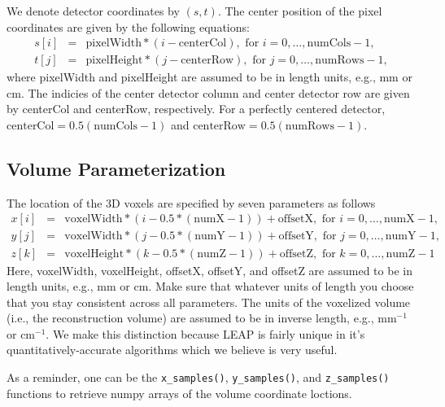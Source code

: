 \documentclass[11pt]{article}
\begin{document}
We denote detector coordinates by $(s,t)$.  The center position of the pixel coordinates are given by the following equations:
\begin{eqnarray*}
s[i] &=& \text{pixelWidth}*(i - \text{centerCol}), \text{ for } i = 0, \dots, \text{numCols}-1, \\
t[j] &=& \text{pixelHeight}*(j - \text{centerRow}), \text{ for } j = 0, \dots, \text{numRows}-1,
\end{eqnarray*}
where pixelWidth and pixelHeight are assumed to be in length units, e.g., mm or cm.  The indicies of the center detector column and center detector row are given by centerCol and centerRow, respectively.  For a perfectly centered detector, $\text{centerCol} = 0.5(\text{numCols}-1)$ and $\text{centerRow} = 0.5(\text{numRows}-1)$.

\subsection{Volume Parameterization} \label{sec:VolumeParameterization}

The location of the 3D voxels are specified by seven parameters as follows
\begin{eqnarray*}
x[i] &=& \text{voxelWidth}*(i - 0.5*(\text{numX}-1)) + \text{offsetX}, \text{ for } i = 0, \dots, \text{numX}-1, \\
y[j] &=& \text{voxelWidth}*(j - 0.5*(\text{numY}-1)) + \text{offsetY}, \text{ for } j = 0, \dots, \text{numY}-1, \\
z[k] &=& \text{voxelHeight}*(k - 0.5*(\text{numZ}-1)) + \text{offsetZ}, \text{ for } k = 0, \dots, \text{numZ}-1
\end{eqnarray*}
Here, voxelWidth, voxelHeight, offsetX, offsetY, and offsetZ are assumed to be in length units, e.g., mm or cm.  Make sure that whatever units of length you choose that you stay consistent across all parameters.  The units of the voxelized volume (i.e., the reconstruction volume) are assumed to be in inverse length, e.g., mm$^{-1}$ or cm$^{-1}$.  We make this distinction because LEAP is fairly unique in it's quantitatively-accurate algorithms which we believe is very useful.

As a reminder, one can be the \texttt{x\_samples()}, \texttt{y\_samples()}, and \texttt{z\_samples()} functions to retrieve numpy arrays of the volume coordinate loctions.
\end{document}
